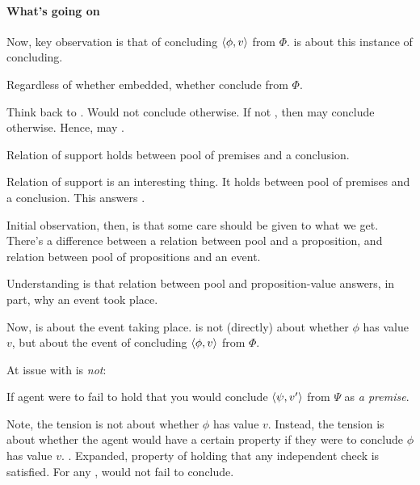 \paragraph{What's going on}

\begin{note}
  Now, key observation is that \requ{} of concluding \(\langle \phi, v \rangle\) from \(\Phi\).
  \qzS{} is about this instance of concluding.

  Regardless of whether embedded, whether conclude from \(\Phi\).

  Think back to \requ{}.
  Would not conclude otherwise.
  If not \fc{}, then may conclude otherwise.
  Hence, may \deadEnd{} \support{}.
\end{note}

\begin{note}
  \begin{observation}
    Relation of support holds between pool of premises and a conclusion.
  \end{observation}
\end{note}

\begin{note}
  Relation of support is an interesting thing.
  It holds between pool of premises and a conclusion.
  This answers \qWhy{}.

  Initial observation, then, is that some care should be given to what we get.
  There's a difference between a relation between pool and a proposition, and relation between pool of propositions and an event.

  Understanding is that relation between pool and proposition-value answers, in part, why an event took place.
\end{note}

\begin{note}
  Now, \qzS{} is about the event taking place.
  \qzS{} is not (directly) about whether \(\phi\) has value \(v\), but about the event of concluding \(\langle \phi, v \rangle\) from \(\Phi\).
\end{note}

\begin{note}
  At issue with \qzS{} is \emph{not}:

  If agent were to fail to hold that you would conclude \(\langle \psi, v' \rangle\) from \(\Psi\) as \emph{a premise}.
\end{note}

\begin{note}
  Note, the tension is not about whether \(\phi\) has value \(v\).
  Instead, the tension is about whether the agent would have a certain property if they were to conclude \(\phi\) has value \(v\).
  \zS{}.
  Expanded, property of holding that any independent check is satisfied.
  For any \requ{}, would not fail to conclude.
\end{note}

